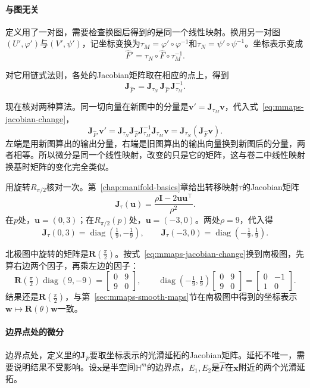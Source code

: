 \paragraph{与图无关}
定义用了一对图，需要检查换图后得到的是同一个线性映射。换用另一对图$(U',\varphi')$与$(V',\psi')$，记坐标变换为$\tau_M=\varphi'\circ\varphi^{-1}$和$\tau_N=\psi'\circ\psi^{-1}$。坐标表示变成
\[
\hat F'=\tau_N\circ\hat F\circ\tau_M^{-1}.
\]

对它用链式法则，各处的Jacobian矩阵取在相应的点上，得到
\begin{equation}
\bm J_{\hat F'}=\bm J_{\tau_N}\,\bm J_{\hat F}\,\bm J_{\tau_M}^{-1}.
\label{eq:mmaps-jacobian-change}
\end{equation}

现在核对两种算法。同一切向量在新图中的分量是$\bm v'=\bm J_{\tau_M}\bm v$，代入式~\eqref{eq:mmaps-jacobian-change}，
\[
\bm J_{\hat F'}\bm v'=\bm J_{\tau_N}\bm J_{\hat F}\bm J_{\tau_M}^{-1}\bm J_{\tau_M}\bm v=\bm J_{\tau_N}(\bm J_{\hat F}\bm v).
\]
左端是用新图算出的输出分量，右端是旧图算出的输出向量换到新图后的分量，两者相等。所以微分是同一个线性映射，改变的只是它的矩阵，这与卷二中线性映射换基时矩阵的变化完全类似。

用旋转$R_{\pi/2}$核对一次。第~\ref{chap:manifold-basics}章给出转移映射$\tau$的Jacobian矩阵
\[
\bm J_\tau(\bm u)=\frac{\rho\bm I-2\bm u\bm u^\top}{\rho^2}.
\]
在$p$处，$\bm u=(0,3)$；在$R_{\pi/2}(p)$处，$\bm u=(-3,0)$。两处$\rho=9$，代入得
\[
\bm J_\tau(0,3)=\operatorname{diag}(\tfrac19,-\tfrac19),\qquad
\bm J_\tau(-3,0)=\operatorname{diag}(-\tfrac19,\tfrac19).
\]

北极图中旋转的矩阵是$\bm R(\tfrac\pi2)$。按式~\eqref{eq:mmaps-jacobian-change}换到南极图，先算右边两个因子，再乘左边的因子：
\[
\bm R(\tfrac\pi2)\operatorname{diag}(9,-9)
=\begin{bmatrix}0&9\\9&0\end{bmatrix},\qquad
\operatorname{diag}(-\tfrac19,\tfrac19)\begin{bmatrix}0&9\\9&0\end{bmatrix}
=\begin{bmatrix}0&-1\\1&0\end{bmatrix}.
\]
结果还是$\bm R(\tfrac\pi2)$，与第~\ref{sec:mmaps-smooth-maps}节在南极图中得到的坐标表示$\bm w\mapsto\bm R(\theta)\bm w$一致。

\paragraph{边界点处的微分}
边界点处，定义里的$\bm J_{\hat F}$要取坐标表示的光滑延拓的Jacobian矩阵。延拓不唯一，需要说明结果不受影响。设$\bm x$是半空间$\mathbb H^m$的边界点，$E_1,E_2$是$\hat F$在$\bm x$附近的两个光滑延拓。

